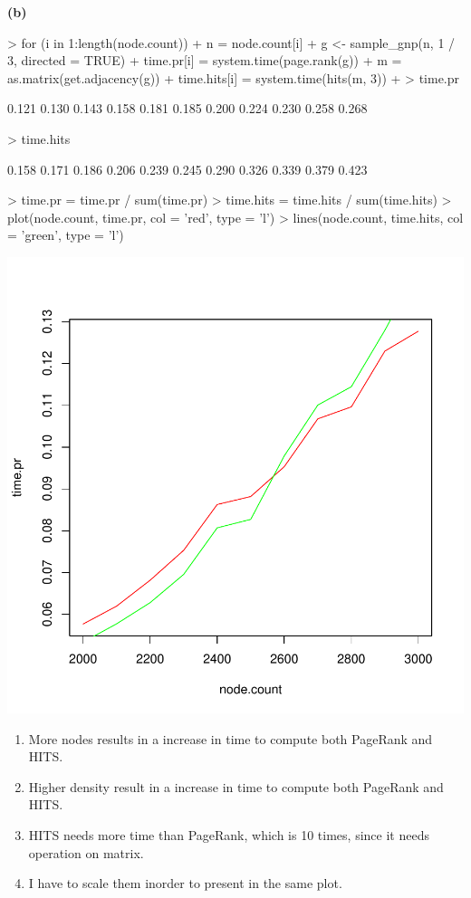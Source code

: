 \documentclass[a4paper]{article}
\renewcommand{\part}[1] {\vspace{.10in} {\bf (#1)}}
\begin{document}
\part{b}
\begin{Schunk}
\begin{Sinput}
> for (i in 1:length(node.count)){
+     n = node.count[i]
+     g <- sample_gnp(n, 1 / 3, directed = TRUE)
+     time.pr[i] = system.time(page.rank(g))
+     m = as.matrix(get.adjacency(g))
+     time.hits[i] = system.time(hits(m, 3))
+ }
> time.pr
\end{Sinput}
\begin{Soutput}
 [1] 0.121 0.130 0.143 0.158 0.181 0.185 0.200 0.224 0.230 0.258 0.268
\end{Soutput}
\begin{Sinput}
> time.hits
\end{Sinput}
\begin{Soutput}
 [1] 0.158 0.171 0.186 0.206 0.239 0.245 0.290 0.326 0.339 0.379 0.423
\end{Soutput}
\begin{Sinput}
> time.pr = time.pr / sum(time.pr)
> time.hits = time.hits / sum(time.hits)
> plot(node.count, time.pr, col = 'red', type = 'l')
> lines(node.count, time.hits, col = 'green', type = 'l')
\end{Sinput}
\end{Schunk}
\includegraphics{graph-2b}

\begin{enumerate}
\item More nodes results in a increase in time to compute both PageRank and HITS.
\item Higher density result in a increase in time to compute both PageRank and HITS.
\item HITS needs more time than PageRank, which is 10 times, since it needs operation on matrix.
\item I have to scale them inorder to present in the same plot.
\end{enumerate}
\end{document}
